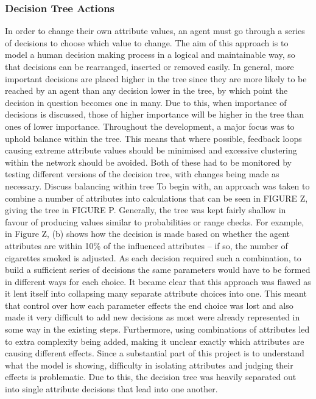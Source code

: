 \documentclass[]{report}
\begin{document}
\subsubsection{Decision Tree Actions}
In order to change their own attribute values, an agent must go through a series of decisions to choose which value to change. The aim of this approach is to model a human decision making process in a logical and maintainable way, so that decisions can be rearranged, inserted or removed easily. In general, more important decisions are placed higher in the tree since they are more likely to be reached by an agent than any decision lower in the tree, by which point the decision in question becomes one in many. Due to this, when importance of decisions is discussed, those of higher importance will be higher in the tree than ones of lower importance. Throughout the development, a major focus was to uphold balance within the tree. This means that where possible, feedback loops causing extreme attribute values should be minimised and excessive clustering within the network should be avoided. Both of these had to be monitored by testing different versions of the decision tree, with changes being made as necessary.
Discuss balancing within tree
To begin with, an approach was taken to combine a number of attributes into calculations that can be seen in FIGURE Z, giving the tree in FIGURE P. Generally, the tree was kept fairly shallow in favour of producing values similar to probabilities or range checks. For example, in Figure Z, (b) shows how the decision is made based on whether the agent attributes are within 10\% of the influenced attributes – if so, the number of cigarettes smoked is adjusted. As each decision required such a combination, to build a sufficient series of decisions the same parameters would have to be formed in different ways for each choice. It became clear that this approach was flawed as it lent itself into collapsing many separate attribute choices into one. This meant that control over how each parameter effects the end choice was lost and also made it very difficult to add new decisions as most were already represented in some way in the existing steps. Furthermore, using combinations of attributes led to extra complexity being added, making it unclear exactly which attributes are causing different effects. Since a substantial part of this project is to understand what the model is showing, difficulty in isolating attributes and judging their effects is problematic. Due to this, the decision tree was heavily separated out into single attribute decisions that lead into one another. 
\end{document}

